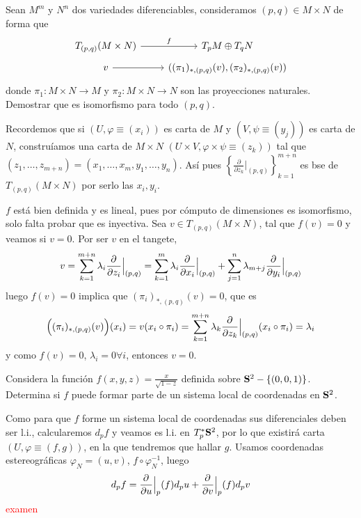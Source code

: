 \begin{ejer}
    [2.24] Sean $M^m$ y $N^n$ dos variedades diferenciables, consideramos $(p,q) \in M \times N$ de forma que
    $$\bt T_{(p,q)}(M \times N) \arrow{r}{f} & T_pM \oplus T_qN \\[-5mm] v \arrow{r} & ((\pi_1)_{*,(p,q)}(v), (\pi_2)_{*,(p,q)}(v))\et$$
    donde $\pi_1: M\times N \longrightarrow M$ y $\pi_2: M \times N \longrightarrow N$ son las proyecciones naturales. Demostrar que es isomorfismo para todo $(p,q)$. 
\end{ejer}
\begin{sol}
    Recordemos que si $(U,\varphi \equiv (x_i))$ es carta de $M$ y $(V, \psi \equiv (y_j))$ es carta de $N$, constru\'iamos una carta de $M\times N$ $(U \times V, \varphi \times \psi \equiv (z_k))$ tal que $(z_1,\ldots, z_{m+n}) = (x_1, \ldots, x_m, y_1, \ldots, y_n)$. As\'i pues $\left\{\frac{\partial}{\partial z_k}|_{(p,q)} \right\}_{k=1}^{m+n}$ es bse de $T_{(p,q)}(M\times N)$ por serlo las $x_i, y_i$. 
    
    $f$ est\'a bien definida y es lineal, pues por c\'omputo de dimensiones es isomorfismo, solo falta probar que es inyectiva. Sea $v\in T_{(p,q)} (M\times N)$, tal que $f(v) = 0$ y veamos si $v=0$. Por ser $v$ en el tangete,
    $$v = \sum_{k=1}^{m+n} \lambda_i \dfrac{\partial^{} }{\partial z_i}\Big|_{(p,q)} = \sum_{k=1}^{m} \lambda_i \dfrac{\partial^{} }{\partial x_i}\Big|_{(p,q)}+\sum_{j=1}^{n} \lambda_{m+j} \dfrac{\partial^{} }{\partial y_i}\Big|_{(p,q)}$$
    luego $f(v)=0$ implica que $(\pi_i)_{*,(p,q)}(v)=0$, que es 
    $$\Big((\pi_i)_{*,(p,q)}(v)\Big)(x_i)=v (x_i \circ \pi_i) = \sum_{k=1}^{m+n} \lambda_k \dfrac{\partial^{} }{\partial z_k}\Big|_{(p,q)} (x_i \circ \pi_i) = \lambda_i$$
    y como $f(v)=0$, $\lambda_i=0 \forall i$, entonces $v=0$. 
\end{sol}
\begin{ejer}
    [2.31] Considera la funci\'on $f(x, y, z) = \frac{x}{\sqrt{1-z}}$ definida sobre $\bold S^2 -\{ (0, 0, 1)\}$. Determina si $f$ puede formar parte de un sistema local de coordenadas en $\bold S^2$.
\end{ejer}
\begin{sol}
    Como para que $f$ forme un sistema local de coordenadas sus diferenciales deben ser l.i., calcularemos $d_pf$ y veamos es l.i. en $T_p^* \bold S^2$, por lo que existir\'a carta $(U, \varphi\equiv(f,g))$, en la que tendremos que hallar $g$. Usamos coordenadas estereogr\'aficas $\varphi_N=(u,v)$, $f\circ \varphi^{-1}_N$, luego 
    $$d_pf = \dfrac{\partial^{} }{\partial u}\Big|_p(f) d_pu + \dfrac{\partial^{} }{\partial v} \Big|_p (f) d_pv$$
    \textcolor{red}{examen}
\end{sol}
